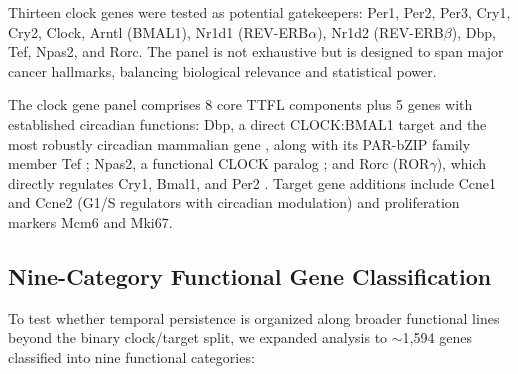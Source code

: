 \documentclass[11pt,letterpaper]{article}
\begin{document}
Thirteen clock genes were tested as potential gatekeepers: Per1, Per2, Per3, Cry1, Cry2, Clock, Arntl (BMAL1), Nr1d1 (REV-ERB$\alpha$), Nr1d2 (REV-ERB$\beta$), Dbp, Tef, Npas2, and Rorc. The panel is not exhaustive but is designed to span major cancer hallmarks, balancing biological relevance and statistical power.

The clock gene panel comprises 8 core TTFL components \citep{takahashi2017} plus 5 genes with established circadian functions: Dbp, a direct CLOCK:BMAL1 target and the most robustly circadian mammalian gene \citep{ripperger2000, wuarin1990}, along with its PAR-bZIP family member Tef \citep{gachon2006}; Npas2, a functional CLOCK paralog \citep{reick2001, debruyne2007}; and Rorc (ROR$\gamma$), which directly regulates Cry1, Bmal1, and Per2 \citep{takeda2012}. Target gene additions include Ccne1 and Ccne2 (G1/S regulators with circadian modulation) and proliferation markers Mcm6 and Mki67.

\subsection{Nine-Category Functional Gene Classification}

To test whether temporal persistence is organized along broader functional lines beyond the binary clock/target split, we expanded analysis to $\sim$1,594 genes classified into nine functional categories:
\end{document}
